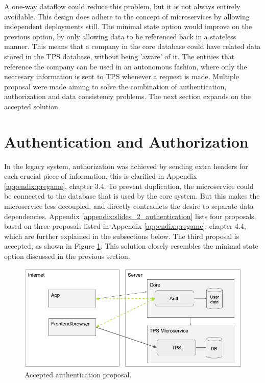 A one-way dataflow could reduce this problem, but it is not always entirely avoidable. This design does adhere to the concept of microservices by allowing independent deployments still. The minimal state option would improve on the previous option, by only allowing data to be referenced back in a stateless manner. This means that a company in the core database could have related data stored in the TPS database, without being 'aware' of it. The entities that reference the company can be used in an autonomous fashion, where only the neccesary information is sent to TPS whenever a request is made. Multiple proposal were made aiming to solve the combination of authentication, authorization and data consistency problems. The next section expands on the accepted solution.

%
\section{Authentication and Authorization}
In the legacy system, authorization was achieved by sending extra headers for each crucial piece of information, this is clarified in Appendix \ref{appendix:pregame}, chapter 3.4. To prevent duplication, the microservice could be connected to the database that is used by the core system. But this makes the microservice less decoupled, and directly contradicts the desire to separate data dependencies. Appendix \ref{appendix:slides_2_authentication} lists four proposals, based on three proposals listed in Appendix \ref{appendix:pregame}, chapter 4.4, which are further explained in the subsections below. The third proposal is accepted, as shown in Figure \ref{fig:Authentication}. This solution closely resembles the minimal state option discussed in the previous section.

\begin{figure}[H]
	\centering
	\includegraphics[width=1\textwidth]{Authentication}
	\caption[Authentication]{Accepted authentication proposal.}
	\label{fig:Authentication}
\end{figure}

